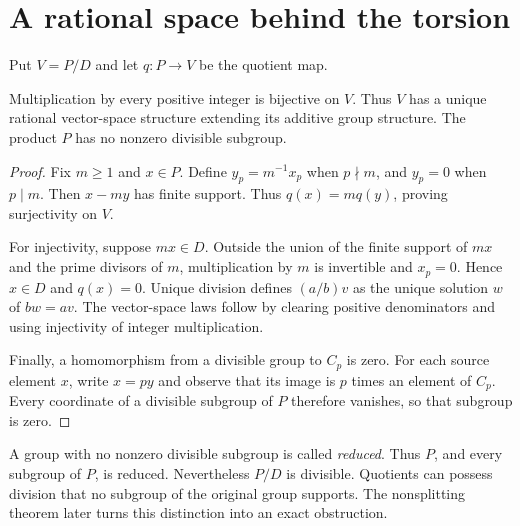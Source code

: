 \section{A rational space behind the torsion}
Put $V=P/D$ and let $q:P\to V$ be the quotient map.

\begin{theorem}
\label{thm:Vrational}
Multiplication by every positive integer is bijective on $V$. Thus $V$ has a unique rational vector-space structure extending its additive group structure. The product $P$ has no nonzero divisible subgroup.
\end{theorem}
\begin{proof}
Fix $m\ge1$ and $x\in P$. Define $y_p=m^{-1}x_p$ when $p\nmid m$, and $y_p=0$ when $p\mid m$. Then $x-my$ has finite support. Thus $q(x)=m q(y)$, proving surjectivity on $V$.

For injectivity, suppose $mx\in D$. Outside the union of the finite support of $mx$ and the prime divisors of $m$, multiplication by $m$ is invertible and $x_p=0$. Hence $x\in D$ and $q(x)=0$. Unique division defines $(a/b)v$ as the unique solution $w$ of $bw=av$. The vector-space laws follow by clearing positive denominators and using injectivity of integer multiplication.

Finally, a homomorphism from a divisible group to $C_p$ is zero. For each source element $x$, write $x=py$ and observe that its image is $p$ times an element of $C_p$. Every coordinate of a divisible subgroup of $P$ therefore vanishes, so that subgroup is zero.
\end{proof}
A group with no nonzero divisible subgroup is called \emph{reduced}. Thus $P$, and every subgroup of $P$, is reduced. Nevertheless $P/D$ is divisible. Quotients can possess division that no subgroup of the original group supports. The nonsplitting theorem later turns this distinction into an exact obstruction.
